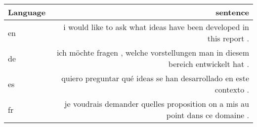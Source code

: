 \begin{tabular}{lr}
\toprule
Language & sentence \\
\toprule
en & i would like to ask what ideas have been developed in this report . \\
de & ich möchte fragen , welche vorstellungen man in diesem bereich entwickelt hat . \\
es & quiero preguntar qué ideas se han desarrollado en este contexto . \\
fr & je voudrais demander quelles proposition on a mis au point dans ce domaine . \\
\bottomrule
\end{tabular}